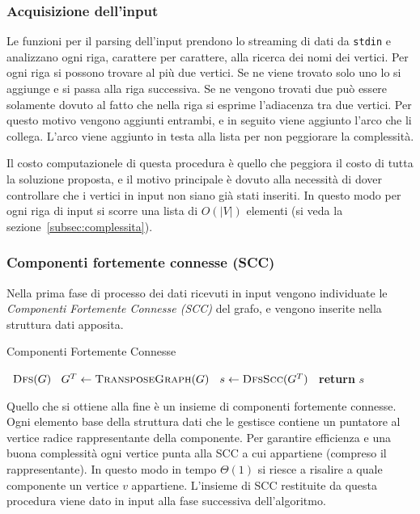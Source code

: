 \documentclass[a4paper,8pt]{article}
\theoremstyle{definition}
\theoremstyle{remark}
\begin{document}
\subsubsection{Acquisizione dell'input}
\label{subsec:input}
Le funzioni per il parsing dell'input prendono lo streaming di dati da \texttt{stdin}
e analizzano ogni riga, carattere per carattere, alla ricerca dei nomi dei vertici.
Per ogni riga si possono trovare al più due vertici. Se ne viene trovato solo uno
lo si aggiunge e si passa alla riga successiva. Se ne vengono trovati due può essere
solamente dovuto al fatto che nella riga si esprime l'adiacenza tra due vertici. Per
questo motivo vengono aggiunti entrambi, e in seguito viene aggiunto l'arco che li
collega. L'arco viene aggiunto in testa alla lista per non peggiorare la complessità.

Il costo computazionele di questa procedura è quello che peggiora il costo di tutta
la soluzione proposta, e il motivo principale è dovuto alla necessità di dover
controllare che i vertici in input non siano già stati inseriti. In questo modo
per ogni riga di input si scorre una lista di $O(|V|)$ elementi (si veda la
sezione~\ref{subsec:complessita}).

\subsubsection{Componenti fortemente connesse (SCC)}
Nella prima fase di processo dei dati ricevuti in input vengono individuate le
\emph{Componenti Fortemente Connesse (SCC)} del grafo, e vengono inserite nella
struttura dati apposita.

\begin{algorithm}
\caption{Componenti Fortemente Connesse}
\label{alg:scc}
\begin{algorithmic}[1] %
    \State\ $\textsc{Dfs}(G)$ 
    \State\ $G^T \gets \textsc{TransposeGraph}(G)$
    \State\ $s \gets \textsc{DfsScc}(G^T)$ 
    \State\ \textbf{return} $s$ 
  \EndProcedure\
\end{algorithmic}
\end{algorithm}

Quello che si ottiene alla fine è un insieme di componenti fortemente connesse.
Ogni elemento base della struttura dati che le gestisce contiene un puntatore al
vertice radice rappresentante della componente. Per garantire efficienza e una buona
complessità ogni vertice punta alla SCC a cui appartiene (compreso il rappresentante).
In questo modo in tempo $\Theta(1)$ si riesce a risalire a quale componente un vertice $v$
appartiene. L'insieme di SCC restituite da questa procedura viene dato in input
alla fase successiva dell'algoritmo.
\end{document}
